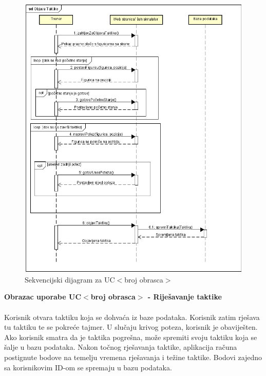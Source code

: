 				
				\begin{figure}[H]
					\centerfloat
        					\includegraphics[scale=0.30]{dijagrami/ObjavaTaktike.jpg} %
        					\caption{Sekvencijski dijagram za UC$<$broj obrasca$>$}
        					\label{fig:UC$<$broj obrasca$>$}
				\end{figure}
				
				\eject
				
				\textbf{Obrazac uporabe UC$<$broj obrasca$>$ - Riješavanje taktike}\\
				\\Korisnik otvara taktiku koja se dohvaća iz baze podataka. Korisnik zatim rješava tu taktiku te se pokreće tajmer. U slučaju krivog poteza, korisnik je obaviješten. Ako korisnik smatra da je taktika pogrešna, može spremiti svoju taktiku koja se šalje u bazu podataka. Nakon točnog rješavanja taktike, aplikacija računa postignute bodove na temelju vremena rješavanja i težine taktike. Bodovi zajedno sa korisnikovim ID-om se spremaju u bazu podataka.
				
